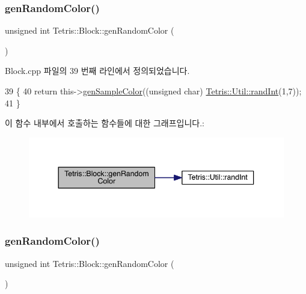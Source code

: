 \subsubsection{\texorpdfstring{gen\+Random\+Color()}{genRandomColor()}\hspace{0.1cm}{\footnotesize\ttfamily [1/2]}}
{\footnotesize\ttfamily unsigned int Tetris\+::\+Block\+::gen\+Random\+Color (\begin{DoxyParamCaption}{ }\end{DoxyParamCaption})}



Block.\+cpp 파일의 39 번째 라인에서 정의되었습니다.


\begin{DoxyCode}
39                                   \{
40                 \textcolor{keywordflow}{return} this->\hyperlink{class_tetris_1_1_block_a9cac65704d2c788488ecf65d5b0467bd}{genSampleColor}((\textcolor{keywordtype}{unsigned} \textcolor{keywordtype}{char})
      \hyperlink{namespace_tetris_1_1_util_aa590e9fd847ac6e0c9bc6bf464b5a74b}{Tetris::Util::randInt}(1,7));
41             \}
\end{DoxyCode}
이 함수 내부에서 호출하는 함수들에 대한 그래프입니다.\+:
\nopagebreak
\begin{figure}[H]
\begin{center}
\leavevmode
\includegraphics[width=344pt]{df/d05/class_tetris_1_1_block_a4bae85cab786853cb3ff76aa7fe72edc_cgraph}
\end{center}
\end{figure}
\mbox{\label{class_tetris_1_1_block_a4bae85cab786853cb3ff76aa7fe72edc}} 
\subsubsection{\texorpdfstring{gen\+Random\+Color()}{genRandomColor()}\hspace{0.1cm}{\footnotesize\ttfamily [2/2]}}
{\footnotesize\ttfamily unsigned int Tetris\+::\+Block\+::gen\+Random\+Color (\begin{DoxyParamCaption}{ }\end{DoxyParamCaption})\hspace{0.3cm}{\ttfamily [inline]}}

